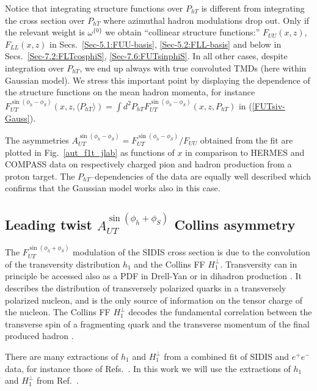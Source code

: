 \documentclass[a4paper,11pt]{article}
\newcommand{\blue}[1]{{\color{blue} #1}}
\newcommand{\la}{\langle}
\newcommand{\ra}{\rangle}
\newcommand{\ps}[1]{\blue{ #1}}
\def\Phperp{P_{hT}}
\begin{document}
Notice that integrating structure functions over $\Phperp$
is different from integrating the cross section over $\Phperp$
where azimuthal hadron modulations drop out. 
Only if the relevant weight is $\omega^{\{0\}}$ we obtain
``collinear structure functions:''  $F_{UU}(x,z)$, $F_{LL}(x,z)$ 
in Secs.~\ref{Sec-5.1:FUU-basis}, \ref{Sec-5.2:FLL-basis}
and below in Secs.~\ref{Sec-7.2:FLTcosphiS}, \ref{Sec-7.6:FUTsinphiS}.
In all other cases, despite integration over $\Phperp$, we end up 
always with true convoluted TMDs (here within Gaussian model).
We stress this important point by displaying the dependence of 
the structure functions on the mean hadron momenta, for instance
$F_{UT}^{\sin(\phi_h-\phi_S)}(x,z,\la\Phperp\ra) = 
\int d^2\Phperp F_{UT}^{\sin(\phi_h-\phi_S)}(x,z,\Phperp)$
in (\ref{FUTsiv-Gauss}).

The asymmetries $A_{UT}^{\sin(\phi_h-\phi_S)}= F_{UT}^{\sin(\phi_h-\phi_S)}/F_{UU}$  
\ps{obtained from the fit \cite{Anselmino:2011gs}
are plotted in Fig.~\ref{aut_f1t_jlab} as functions of $x$ in comparison 
to HERMES \cite{Airapetian:2009ae} and COMPASS \cite{Adolph:2012sp} data 
on respectively charged pion and hadron production from a proton target.
The $P_{hT}$--dependencies of the data are equally well described which
confirms that the Gaussian model works also in this case.}





\newpage
\subsection{\boldmath Leading twist $A_{UT}^{\sin(\phi_h+\phi_S)}$ Collins asymmetry}
\label{Sec-5.4:Collins-basis}

The $F_{UT}^{\sin(\phi_h+\phi_S)}$ modulation of the SIDIS cross section is due 
to the convolution of the transversity distribution $h_1$ and the Collins 
FF $H_1^\perp$. Transversity can in principle be accessed also as a PDF in
Drell-Yan \ps{or in dihadron production 
\cite{Bacchetta:2002ux,Bacchetta:2003vn,Bacchetta:2011ip,Bacchetta:2012ty,
Radici:2015mwa,Radici:2018iag}.}
It describes the distribution of transversely polarized quarks
in a transversely polarized nucleon, and is the only source of information 
on the tensor charge of the nucleon. The Collins FF $H_1^\perp$ decodes the 
fundamental correlation between the transverse spin of a fragmenting quark 
and the transverse momentum of the final produced hadron \cite{Collins:1992kk}.

There are many extractions of $h_1$ and $H_1^\perp$ from a 
combined fit of SIDIS and $e^+e^-$ data, for instance those of 
Refs.~\cite{Anselmino:2013vqa,Kang:2014zza,Anselmino:2015sxa}.
In this work we will use the extractions of $h_1$ and $H_1^\perp$ 
from Ref.~\cite{Anselmino:2013vqa}.
\end{document}
